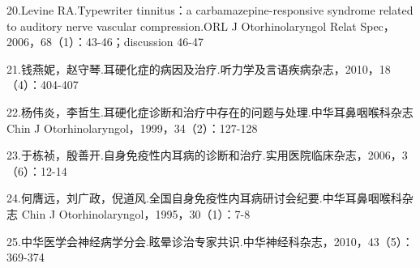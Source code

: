 20.Levine RA.Typewriter tinnitus：a carbamazepine-responsive syndrome
related to auditory nerve vascular compression.ORL J Otorhinolaryngol
Relat Spec，2006，68（1）：43-46；discussion 46-47

21.钱燕妮，赵守琴.耳硬化症的病因及治疗.听力学及言语疾病杂志，2010，18（4）：404-407

22.杨伟炎，李哲生.耳硬化症诊断和治疗中存在的问题与处理.中华耳鼻咽喉科杂志Chin
J Otorhinolaryngol，1999，34（2）：127-128

23.于栋祯，殷善开.自身免疫性内耳病的诊断和治疗.实用医院临床杂志，2006，3（6）：12-14

24.何膺远，刘广政，倪道风.全国自身免疫性内耳病研讨会纪要.中华耳鼻咽喉科杂志
Chin J Otorhinolaryngol，1995，30（1）：7-8

25.中华医学会神经病学分会.眩晕诊治专家共识.中华神经科杂志，2010，43（5）：369-374

\protect\hypertarget{text00364.html}{}{}

